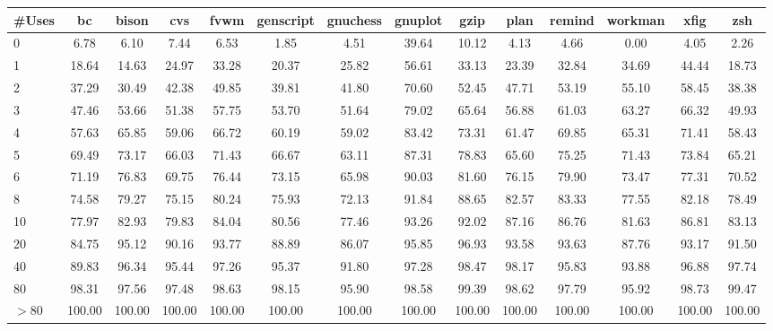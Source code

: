\begin{tabular}{|l|c|c|c|c|c|c|c|c|c|c|c|c|c|}\hline
\#Uses & bc & bison & cvs & fvwm & genscript & gnuchess & gnuplot & gzip & plan & remind & workman & xfig & zsh\\\hline\hline
0 & 6.78 & 6.10 & 7.44 & 6.53 & 1.85 & 4.51 & 39.64 & 10.12 & 4.13 & 4.66 & 0.00 & 4.05 & 2.26\\\hline
1 & 18.64 & 14.63 & 24.97 & 33.28 & 20.37 & 25.82 & 56.61 & 33.13 & 23.39 & 32.84 & 34.69 & 44.44 & 18.73\\\hline
2 & 37.29 & 30.49 & 42.38 & 49.85 & 39.81 & 41.80 & 70.60 & 52.45 & 47.71 & 53.19 & 55.10 & 58.45 & 38.38\\\hline
3 & 47.46 & 53.66 & 51.38 & 57.75 & 53.70 & 51.64 & 79.02 & 65.64 & 56.88 & 61.03 & 63.27 & 66.32 & 49.93\\\hline
4 & 57.63 & 65.85 & 59.06 & 66.72 & 60.19 & 59.02 & 83.42 & 73.31 & 61.47 & 69.85 & 65.31 & 71.41 & 58.43\\\hline
5 & 69.49 & 73.17 & 66.03 & 71.43 & 66.67 & 63.11 & 87.31 & 78.83 & 65.60 & 75.25 & 71.43 & 73.84 & 65.21\\\hline
6 & 71.19 & 76.83 & 69.75 & 76.44 & 73.15 & 65.98 & 90.03 & 81.60 & 76.15 & 79.90 & 73.47 & 77.31 & 70.52\\\hline
8 & 74.58 & 79.27 & 75.15 & 80.24 & 75.93 & 72.13 & 91.84 & 88.65 & 82.57 & 83.33 & 77.55 & 82.18 & 78.49\\\hline
10 & 77.97 & 82.93 & 79.83 & 84.04 & 80.56 & 77.46 & 93.26 & 92.02 & 87.16 & 86.76 & 81.63 & 86.81 & 83.13\\\hline
20 & 84.75 & 95.12 & 90.16 & 93.77 & 88.89 & 86.07 & 95.85 & 96.93 & 93.58 & 93.63 & 87.76 & 93.17 & 91.50\\\hline
40 & 89.83 & 96.34 & 95.44 & 97.26 & 95.37 & 91.80 & 97.28 & 98.47 & 98.17 & 95.83 & 93.88 & 96.88 & 97.74\\\hline
80 & 98.31 & 97.56 & 97.48 & 98.63 & 98.15 & 95.90 & 98.58 & 99.39 & 98.62 & 97.79 & 95.92 & 98.73 & 99.47\\\hline
$>$80 & 100.00 & 100.00 & 100.00 & 100.00 & 100.00 & 100.00 & 100.00 & 100.00 & 100.00 & 100.00 & 100.00 & 100.00 & 100.00\\\hline
\hline
\end{tabular}
